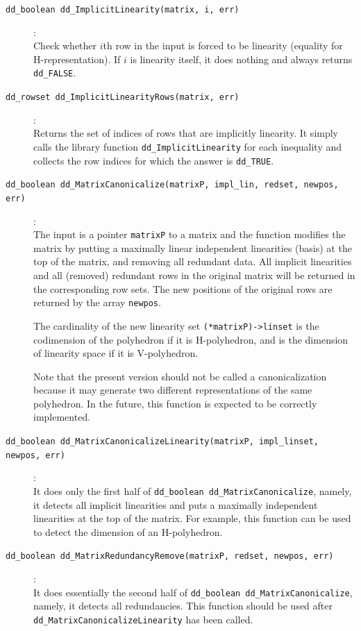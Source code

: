 \documentclass[11pt]{article}
\newcommand {\0} {{\bf 0}}
\begin{document}
\begin{description}
\item[{\tt dd\_boolean dd\_ImplicitLinearity(matrix, i, err)}]:\\
Check whether $i$th row
in the input is forced to be linearity (equality
for H-representation).
If $i$ is linearity itself,
it does nothing and always returns {\tt dd\_FALSE}.

\item[{\tt dd\_rowset dd\_ImplicitLinearityRows(matrix, err)}]:\\
Returns the set of indices of rows that are
implicitly linearity.  It simply calls the library function
{\tt dd\_ImplicitLinearity} for each inequality and collects
the row indices for which the answer is {\tt dd\_TRUE}.

\item[{\tt dd\_boolean dd\_MatrixCanonicalize(matrixP, impl\_lin, redset, newpos, err)}]:\\
 The input is a pointer {\tt matrixP} to a matrix and the function
modifies the matrix by putting a maximally linear independent linearities (basis)
at the top of the matrix, and removing all redundant data.
All implicit linearities and all (removed) redundant rows
in the original matrix will be returned in the corresponding row sets.
The new positions of the original rows are returned by
the array {\tt newpos}.

The cardinality of the new linearity set {\tt  (*matrixP)->linset} is the codimension
of the polyhedron if it is H-polyhedron, and is the dimension of linearity space
if it is V-polyhedron.

Note that the present version should not be called a canonicalization
because it may generate two different representations of the same
polyhedron.  In the future, this function is expected to be correctly
implemented.

\item[{\tt dd\_boolean dd\_MatrixCanonicalizeLinearity(matrixP, impl\_linset, newpos, err)}]:\\
It does only the first half of {\tt dd\_boolean dd\_MatrixCanonicalize}, namely, it detects all
implicit linearities and puts a maximally independent linearities
at the top of the matrix.  For example, this function can be
used to detect the dimension of an H-polyhedron.

\item[{\tt dd\_boolean dd\_MatrixRedundancyRemove(matrixP, redset, newpos, err)}]:\\
It does essentially the second half of {\tt dd\_boolean dd\_MatrixCanonicalize},
namely, it detects all
redundancies.  This function should be used after {\tt dd\_MatrixCanonicalizeLinearity}
has been called.



\end{description}
\end{document}
